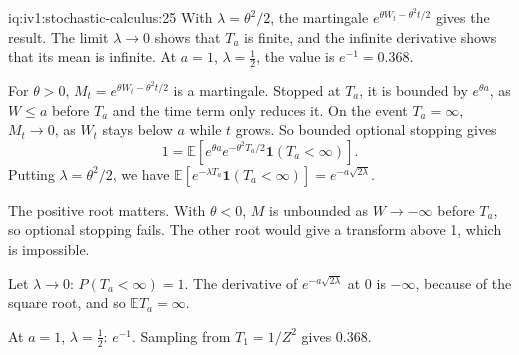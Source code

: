 \begin{solution}{iq:iv1:stochastic-calculus:25}
With $\lambda = \theta^2/2$, the martingale $e^{\theta W_t - \theta^2t/2}$ gives the result. The limit $\lambda \to 0$ shows that $T_a$ is finite, and the infinite derivative shows that its mean is infinite. At $a = 1$, $\lambda = \frac12$, the value is $e^{-1} = 0.368$.

For $\theta > 0$, $M_t = e^{\theta W_t - \theta^2t/2}$ is a martingale. Stopped at $T_a$, it is bounded by $e^{\theta a}$, as $W \le a$ before $T_a$ and the time term only reduces it. On the event $T_a = \infty$, $M_t \to 0$, as $W_t$ stays below $a$ while $t$ grows. So bounded optional stopping gives
\[
1 = \mathbb{E}\left[e^{\theta a}e^{-\theta^2T_a/2}\mathbf{1}(T_a < \infty)\right].
\]
Putting $\lambda = \theta^2/2$, we have $\mathbb{E}[e^{-\lambda T_a}\mathbf{1}(T_a < \infty)] = e^{-a\sqrt{2\lambda}}$.

The positive root matters. With $\theta < 0$, $M$ is unbounded as $W \to -\infty$ before $T_a$, so optional stopping fails. The other root would give a transform above 1, which is impossible.

Let $\lambda \to 0$: $P(T_a < \infty) = 1$. The derivative of $e^{-a\sqrt{2\lambda}}$ at 0 is $-\infty$, because of the square root, and so $\mathbb{E}T_a = \infty$.

At $a = 1$, $\lambda = \frac12$: $e^{-1}$. Sampling from $T_1 = 1/Z^2$ gives $0.368$.



\end{solution}


